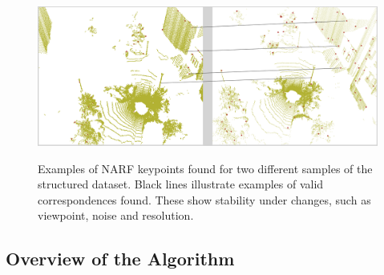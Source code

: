 \begin{figure}[H]
    \centering
    \includegraphics[width=0.995\linewidth]{img/chap_slam/features_line.png}\\
    \caption{Examples of NARF keypoints found for two different samples of the structured dataset. Black lines illustrate examples of valid correspondences found. These show stability under changes, such as viewpoint, noise and resolution.}
    \label{fig:chap_slam_features_correspondences}
\end{figure}


\subsection{Overview of the Algorithm}
\label{ssec:chap_slam_algo}

